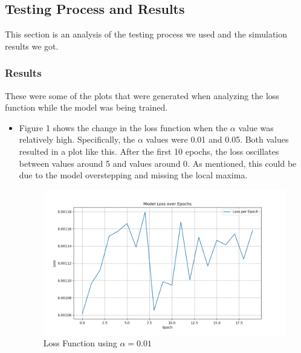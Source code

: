 \documentclass[11pt]{article}
\begin{document}
\subsection{Testing Process and Results}
This section is an analysis of the testing process we used and the simulation results we got. 
\subsubsection{Results}
These were some of the plots that were generated when analyzing the loss function while the model was being trained. 
\begin{itemize}
\item Figure 1 shows the change in the loss function when the $\alpha$ value was relatively high. Specifically, the $\alpha$ values were 0.01 and 0.05. Both values resulted in a plot like this. After the first 10 epochs, the loss oscillates between values around 5 and values around 0. As mentioned, this could be due to the model overstepping and missing the local maxima.  
        \begin{figure}[H]
        \centering
        \includegraphics[width=0.8\linewidth]{loss_m2highalpha.png}
        \caption{Loss Function using $\alpha = 0.01$}
        \end{figure}
       

\end{itemize}
\end{document}
